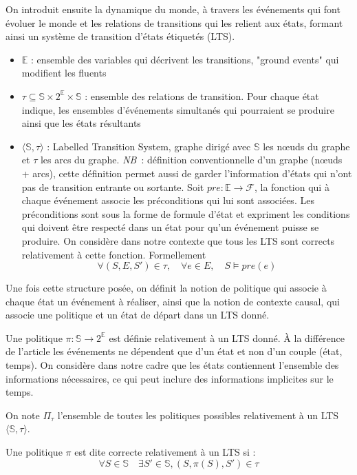 On introduit ensuite la dynamique du monde, à travers les événements qui font évoluer le monde et les relations de transitions qui les relient aux états, formant ainsi un système de transition d'états étiquetés (LTS).
\begin{itemize}
    \item $\mathds{E}$ : ensemble des variables qui décrivent les transitions, "ground events" qui modifient les fluents
    \item $\tau \subseteq \mathds{S} \times 2^{\mathds{E}} \times \mathds{S}$ : ensemble des relations de transition. Pour chaque état indique, les  ensembles d'événements simultanés qui pourraient se produire ainsi que les états résultants
    \item $\langle\mathds{S}, \tau\rangle$ : Labelled Transition System, graphe dirigé avec $\mathds{S}$ les nœuds du graphe et $\tau$ les arcs du graphe. \textit{NB}~: définition conventionnelle d'un graphe (nœuds + arcs), cette définition permet aussi de garder l'information d'états qui n'ont pas de transition entrante ou sortante. Soit $pre: \mathds{E}\to \mathcal{F}$, la fonction qui à chaque événement associe les préconditions qui lui sont associées. Les préconditions sont sous la forme de formule d'état et expriment les conditions qui doivent être respecté dans un état pour qu'un événement puisse se produire. On considère dans notre contexte que tous les LTS sont corrects relativement à cette fonction. Formellement
        \begin{equation*}
            \forall (S,E,S') \in \tau,  \quad \forall e \in E, \quad S\models pre(e)
        \end{equation*}
    \end{itemize}


Une fois cette structure posée, on définit la notion de politique qui associe à chaque état un événement à réaliser, ainsi que la notion de contexte causal, qui associe une politique et un état de départ dans un LTS donné.

\begin{definition}[Politique]
    Une politique $\pi : \mathds{S} \to 2^{\mathds{E}}$ est définie relativement à un LTS donné. À la différence de l'article \textcite{sarmiento_formalising_2025} les événements ne dépendent que d'un état et non d'un couple (état, temps). On considère dans notre cadre que les états contiennent l'ensemble des informations nécessaires, ce qui peut inclure des informations implicites sur le temps.

    On note $\Pi_\tau$ l'ensemble de toutes les politiques possibles relativement à un LTS $\langle\mathds{S},\tau\rangle$.

    Une politique $\pi$ est dite correcte relativement à un LTS si : 
    \begin{equation*}
        \forall S \in \mathds{S} \quad \exists S'\in \mathds{S}, (S, \pi(S),S')\in \tau
    \end{equation*}
\end{definition}

